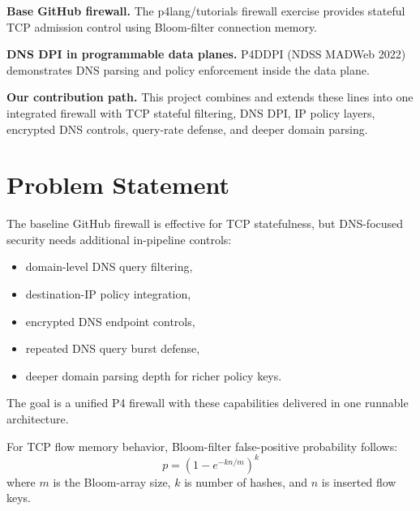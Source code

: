 \documentclass[sigconf,nonacm]{acmart}
\begin{document}
\textbf{Base GitHub firewall.} The p4lang/tutorials firewall exercise provides
stateful TCP admission control using Bloom-filter connection memory.

\textbf{DNS DPI in programmable data planes.} P4DDPI (NDSS MADWeb 2022)
demonstrates DNS parsing and policy enforcement inside the data plane.

\textbf{Our contribution path.} This project combines and extends these lines
into one integrated firewall with TCP stateful filtering, DNS DPI, IP policy
layers, encrypted DNS controls, query-rate defense, and deeper domain parsing.


\section{Problem Statement}
The baseline GitHub firewall is effective for TCP statefulness, but DNS-focused
security needs additional in-pipeline controls:
\begin{itemize}
  \item domain-level DNS query filtering,
  \item destination-IP policy integration,
  \item encrypted DNS endpoint controls,
  \item repeated DNS query burst defense,
  \item deeper domain parsing depth for richer policy keys.
\end{itemize}

The goal is a unified P4 firewall with these capabilities delivered in one
runnable architecture.

For TCP flow memory behavior, Bloom-filter false-positive probability follows:
\begin{equation}
  p = \left(1 - e^{-kn/m}\right)^k
\end{equation}
where $m$ is the Bloom-array size, $k$ is number of hashes, and $n$ is inserted
flow keys.
\end{document}
